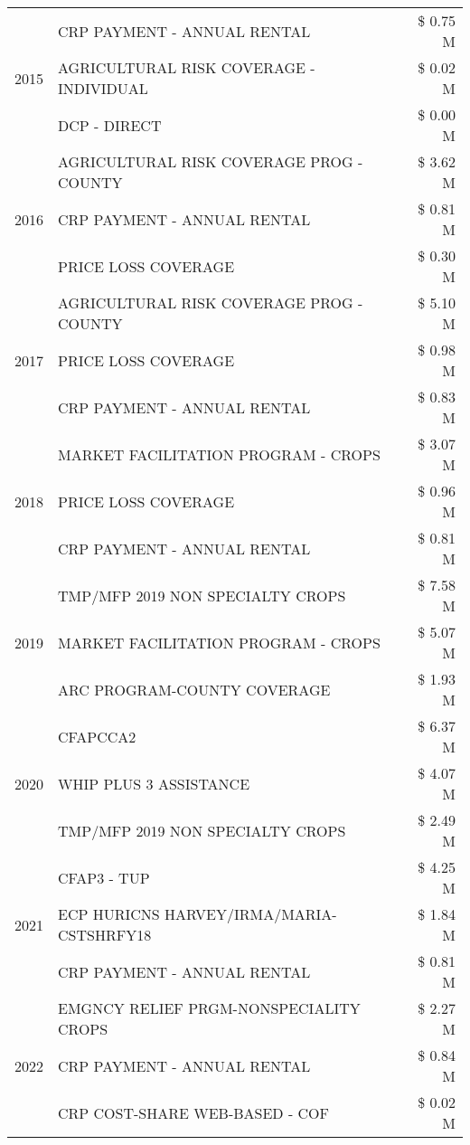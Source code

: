 \begin{tabular}{llr}
\cline{1-3}
\multirow[t]{3}{*}{2015} & CRP PAYMENT - ANNUAL RENTAL & \$ 0.75 M \\
 & AGRICULTURAL RISK COVERAGE - INDIVIDUAL & \$ 0.02 M \\
 & DCP - DIRECT & \$ 0.00 M \\
\cline{1-3}
\multirow[t]{3}{*}{2016} & AGRICULTURAL RISK COVERAGE PROG - COUNTY & \$ 3.62 M \\
 & CRP PAYMENT - ANNUAL RENTAL & \$ 0.81 M \\
 & PRICE LOSS COVERAGE & \$ 0.30 M \\
\cline{1-3}
\multirow[t]{3}{*}{2017} & AGRICULTURAL RISK COVERAGE PROG - COUNTY & \$ 5.10 M \\
 & PRICE LOSS COVERAGE & \$ 0.98 M \\
 & CRP PAYMENT - ANNUAL RENTAL & \$ 0.83 M \\
\cline{1-3}
\multirow[t]{3}{*}{2018} & MARKET FACILITATION PROGRAM - CROPS & \$ 3.07 M \\
 & PRICE LOSS COVERAGE & \$ 0.96 M \\
 & CRP PAYMENT - ANNUAL RENTAL & \$ 0.81 M \\
\cline{1-3}
\multirow[t]{3}{*}{2019} & TMP/MFP 2019 NON SPECIALTY CROPS & \$ 7.58 M \\
 & MARKET FACILITATION PROGRAM - CROPS & \$ 5.07 M \\
 & ARC PROGRAM-COUNTY COVERAGE & \$ 1.93 M \\
\cline{1-3}
\multirow[t]{3}{*}{2020} & CFAPCCA2 & \$ 6.37 M \\
 & WHIP PLUS 3 ASSISTANCE & \$ 4.07 M \\
 & TMP/MFP 2019 NON SPECIALTY CROPS & \$ 2.49 M \\
\cline{1-3}
\multirow[t]{3}{*}{2021} & CFAP3 - TUP & \$ 4.25 M \\
 & ECP HURICNS HARVEY/IRMA/MARIA-CSTSHRFY18 & \$ 1.84 M \\
 & CRP PAYMENT - ANNUAL RENTAL & \$ 0.81 M \\
\cline{1-3}
\multirow[t]{3}{*}{2022} & EMGNCY RELIEF PRGM-NONSPECIALITY CROPS & \$ 2.27 M \\
 & CRP PAYMENT - ANNUAL RENTAL & \$ 0.84 M \\
 & CRP COST-SHARE WEB-BASED - COF & \$ 0.02 M \\
\cline{1-3}
\bottomrule
\end{tabular}
